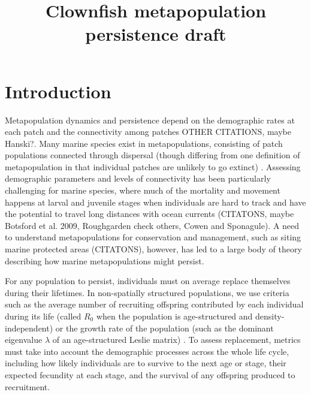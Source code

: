 \documentclass[12pt, oneside]{article}   	%
\title{Clownfish metapopulation persistence draft}
\begin{document}
\date{}
\maketitle{}


\linenumbers{}
\modulolinenumbers[3]

\section*{Introduction}

Metapopulation dynamics and persistence depend on the demographic rates at each patch and the connectivity among patches \citep[e.g.][]{hastings_persistence_2006} OTHER CITATIONS, maybe Hanski?. Many marine species exist in metapopulations, consisting of patch populations connected through dispersal (though differing from one definition of metapopulation in that individual patches are unlikely to go extinct) \citep{kritzer2006marine}. Assessing demographic parameters and levels of connectivity has been particularly challenging for marine species, where much of the mortality and movement happens at larval and juvenile stages when individuals are hard to track and have the potential to travel long distances with ocean currents \citep[e.g.][]{kritzer2006marine}(CITATONS, maybe Botsford et al. 2009, Roughgarden check others, Cowen and Sponagule). A need to understand metapopulations for conservation and management, such as siting marine protected areas (CITATONS), however, has led to a large body of theory describing how marine metapopulations might persist. %

For any population to persist, individuals must on average replace themselves during their lifetimes. In non-spatially structured populations, we use criteria such as the average number of recruiting offspring contributed by each individual during its life (called $R_0$ when the population is age-structured and density-independent) or the growth rate of the population (such as the dominant eigenvalue $\lambda$ of an age-structured Leslie matrix) \citep{caswell_matrix_2001, burgess2014beyond}. To assess replacement, metrics must take into account the demographic processes across the whole life cycle, including how likely individuals are to survive to the next age or stage, their expected fecundity at each stage, and the survival of any offspring produced to recruitment. %
\end{document}
